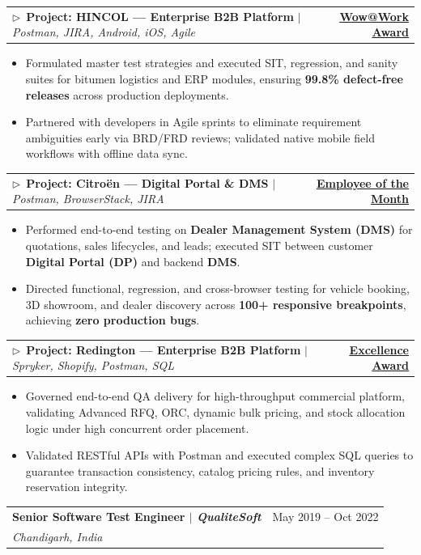 \documentclass[a4paper,11pt]{article}
\makeatletter
\newcommand{\resumeItem}[1]{
  \item\small{
    {#1 \vspace{-2pt}}
  }
}
\newcommand{\resumeSubheading}[4]{
  \vspace{-2pt}\item
    \begin{tabular*}{\textwidth}[t]{l@{\extracolsep{\fill}}r}
      \textbf{#1} & #2 \\
      \textit{\small#3} & \textit{\small #4} \\
    \end{tabular*}\vspace{-6pt}
}
\newcommand{\resumeProjectHeading}[2]{
    \item\hspace{4pt}
    \begin{tabular*}{\textwidth}{l@{\extracolsep{\fill}}r}
      \small#1 & #2 \\
    \end{tabular*}\vspace{-6pt}
}
\newcommand{\resumeItemListStart}{\begin{itemize}}
\newcommand{\resumeItemListEnd}{\end{itemize}\vspace{-5pt}}
\makeatother
\begin{document}
      \resumeProjectHeading
          {$\triangleright$\ \textbf{Project: HINCOL --- Enterprise B2B Platform} $|$ \emph{Postman, JIRA, Android, iOS, Agile}}{\href{https://aksihol.github.io/Akash-Resume/assets/wow-at-work-akash-sihol.png}{\underline{\textbf{Wow@Work Award}}}}
      \resumeItemListStart
        \resumeItem{Formulated master test strategies and executed SIT, regression, and sanity suites for bitumen logistics and ERP modules, ensuring \textbf{99.8\% defect-free releases} across production deployments.}
        \resumeItem{Partnered with developers in Agile sprints to eliminate requirement ambiguities early via BRD/FRD reviews; validated native mobile field workflows with offline data sync.}
      \resumeItemListEnd

      \resumeProjectHeading
          {$\triangleright$\ \textbf{Project: Citro{\"e}n --- Digital Portal \& DMS} $|$ \emph{Postman, BrowserStack, JIRA}}{\href{https://aksihol.github.io/Akash-Resume/assets/employee-of-the-month.jpeg}{\underline{\textbf{Employee of the Month}}}}
      \resumeItemListStart
        \resumeItem{Performed end-to-end testing on \textbf{Dealer Management System (DMS)} for quotations, sales lifecycles, and leads; executed SIT between customer \textbf{Digital Portal (DP)} and backend \textbf{DMS}.}
        \resumeItem{Directed functional, regression, and cross-browser testing for vehicle booking, 3D showroom, and dealer discovery across \textbf{100+ responsive breakpoints}, achieving \textbf{zero production bugs}.}
      \resumeItemListEnd

      \resumeProjectHeading
          {$\triangleright$\ \textbf{Project: Redington --- Enterprise B2B Platform} $|$ \emph{Spryker, Shopify, Postman, SQL}}{\href{https://aksihol.github.io/Akash-Resume/assets/excellence-premier-league.jpeg}{\underline{\textbf{Excellence Award}}}}
      \resumeItemListStart
        \resumeItem{Governed end-to-end QA delivery for high-throughput commercial platform, validating Advanced RFQ, ORC, dynamic bulk pricing, and stock allocation logic under high concurrent order placement.}
        \resumeItem{Validated RESTful APIs with Postman and executed complex SQL queries to guarantee transaction consistency, catalog pricing rules, and inventory reservation integrity.}
      \resumeItemListEnd

    \vspace{4pt}
    \resumeSubheading
      {Senior Software Test Engineer $|$ \textit{\textnormal{QualiteSoft}}}{May 2019 -- Oct 2022}
      {Chandigarh, India}{}
\end{document}
